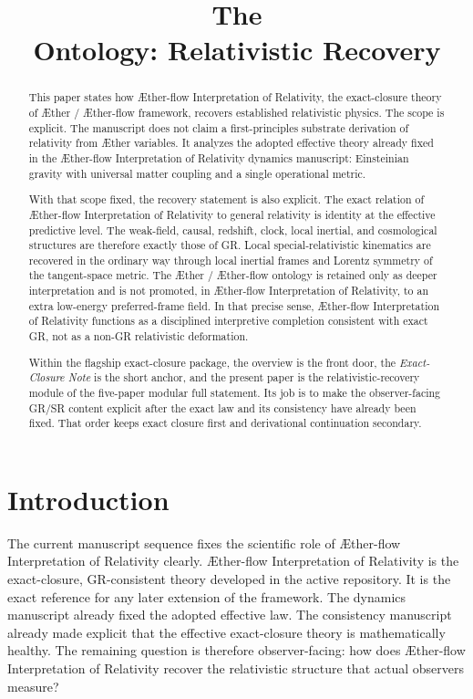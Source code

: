 \documentclass[11pt]{article}
\title{The \TheoryName{}\\[0.4em]
Ontology: Relativistic Recovery}
\author{}
\date{}
\newcommand{\Aether}{\AE{}ther}
\newcommand{\Aflow}{\AE{}ther-flow}
\newcommand{\TheoryName}{\Aflow{} Interpretation of Relativity}
\newcommand{\TheoryProgram}{\Aether{} / \Aflow{} framework}
\begin{document}
\AetherFlowAPATitlePage

\begin{abstract}
This paper states how \TheoryName{}, the exact-closure theory of \TheoryProgram{}, recovers established relativistic physics. The scope is explicit. The manuscript does not claim a first-principles substrate derivation of relativity from \Aether{} variables. It analyzes the adopted effective theory already fixed in the \TheoryName{} dynamics manuscript: Einsteinian gravity with universal matter coupling and a single operational metric.

With that scope fixed, the recovery statement is also explicit. The exact relation of \TheoryName{} to general relativity is identity at the effective predictive level. The weak-field, causal, redshift, clock, local inertial, and cosmological structures are therefore exactly those of GR. Local special-relativistic kinematics are recovered in the ordinary way through local inertial frames and Lorentz symmetry of the tangent-space metric. The \Aether{} / \Aflow{} ontology is retained only as deeper interpretation and is not promoted, in \TheoryName{}, to an extra low-energy preferred-frame field. In that precise sense, \TheoryName{} functions as a disciplined interpretive completion consistent with exact GR, not as a non-GR relativistic deformation.

Within the flagship exact-closure package, the overview is the front door, the \emph{Exact-Closure Note} is the short anchor, and the present paper is the relativistic-recovery module of the five-paper modular full statement. Its job is to make the observer-facing GR/SR content explicit after the exact law and its consistency have already been fixed. That order keeps exact closure first and derivational continuation secondary.
\end{abstract}

\section{Introduction}

The current manuscript sequence fixes the scientific role of \TheoryName{} clearly. \TheoryName{} is the exact-closure, GR-consistent theory developed in the active repository. It is the exact reference for any later extension of the framework. The dynamics manuscript already fixed the adopted effective law. The consistency manuscript already made explicit that the effective exact-closure theory is mathematically healthy. The remaining question is therefore observer-facing: how does \TheoryName{} recover the relativistic structure that actual observers measure?
\end{document}
